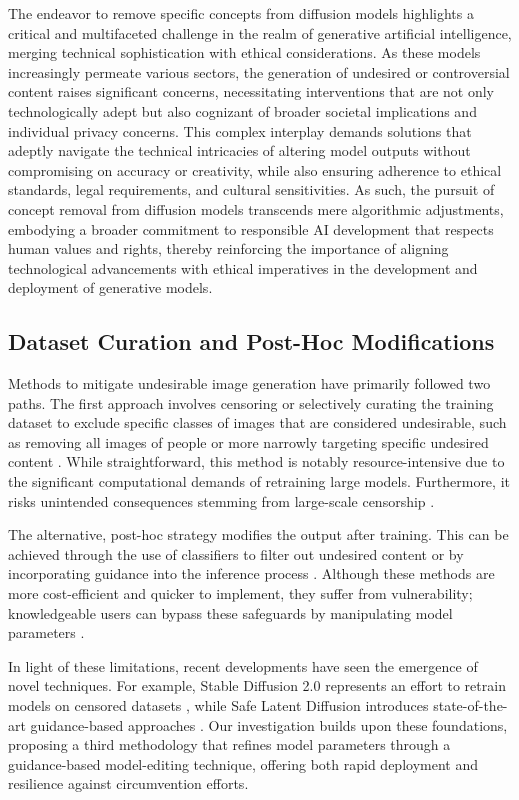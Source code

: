 The endeavor to remove specific concepts from diffusion models highlights a critical and multifaceted challenge in the realm of generative artificial intelligence, merging technical sophistication with ethical considerations. As these models increasingly permeate various sectors, the generation of undesired or controversial content raises significant concerns, necessitating interventions that are not only technologically adept but also cognizant of broader societal implications and individual privacy concerns. This complex interplay demands solutions that adeptly navigate the technical intricacies of altering model outputs without compromising on accuracy or creativity, while also ensuring adherence to ethical standards, legal requirements, and cultural sensitivities. As such, the pursuit of concept removal from diffusion models transcends mere algorithmic adjustments, embodying a broader commitment to responsible AI development that respects human values and rights, thereby reinforcing the importance of aligning technological advancements with ethical imperatives in the development and deployment of generative models.

\subsection{Dataset Curation and Post-Hoc Modifications}
Methods to mitigate undesirable image generation have primarily followed two paths. The first approach involves censoring or selectively curating the training dataset to exclude specific classes of images that are considered undesirable, such as removing all images of people or more narrowly targeting specific undesired content \cite{25,39,27,33}. While straightforward, this method is notably resource-intensive due to the significant computational demands of retraining large models. Furthermore, it risks unintended consequences stemming from large-scale censorship \cite{26}.

The alternative, post-hoc strategy modifies the output after training. This can be achieved through the use of classifiers to filter out undesired content \cite{3,21,29} or by incorporating guidance into the inference process \cite{38}. Although these methods are more cost-efficient and quicker to implement, they suffer from vulnerability; knowledgeable users can bypass these safeguards by manipulating model parameters \cite{43}.

In light of these limitations, recent developments have seen the emergence of novel techniques. For example, Stable Diffusion 2.0 represents an effort to retrain models on censored datasets \cite{30}, while Safe Latent Diffusion introduces state-of-the-art guidance-based approaches \cite{38}. Our investigation builds upon these foundations, proposing a third methodology that refines model parameters through a guidance-based model-editing technique, offering both rapid deployment and resilience against circumvention efforts.

